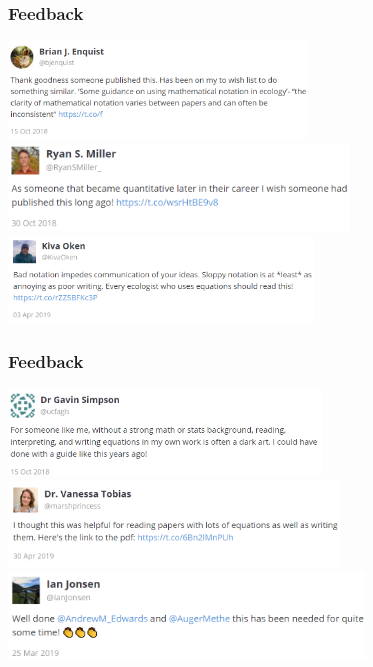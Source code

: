 \begin{frame}
\frametitle{Feedback}

\centering
\includegraphics[height=2.6cm]{images/twitter-enquist.png}
\includegraphics[height=2.3cm]{images/twitter-miller.png}
\includegraphics[height=2.3cm]{images/twitter-oken.png}

\end{frame}


\begin{frame}
\frametitle{Feedback}

\centering
\includegraphics[height=2.3cm]{images/twitter-simpson.png}
\includegraphics[height=2.3cm]{images/twitter-tobias.png}
\includegraphics[height=2.3cm]{images/twitter-jonsen.png}

\end{frame}


